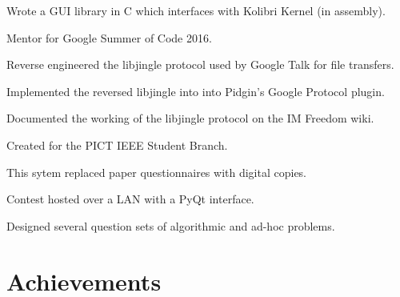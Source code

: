 \documentclass[letterpaper]{deedy-resume} %
\begin{document}
\begin{minipage}[t]{0.66\textwidth}
\begin{tightitemize}
\item Wrote a GUI library in C which interfaces with Kolibri Kernel (in assembly).
\item Mentor for Google Summer of Code 2016.
\end{tightitemize}
\sectionspace %
\begin{tightitemize}
\item Reverse engineered the libjingle protocol used by Google Talk for file transfers.
\item Implemented the reversed libjingle into into Pidgin's Google Protocol plugin.
\item Documented the working of the libjingle protocol on the IM Freedom wiki.
\end{tightitemize}
\sectionspace %
\begin{tightitemize}
\item Created for the PICT IEEE Student Branch.
\item This sytem replaced paper questionnaires with digital copies.
\item Contest hosted over a LAN with a PyQt interface.
\item Designed several question sets of algorithmic and ad-hoc problems.
\end{tightitemize}
\sectionspace %
\section{Achievements}
\sectionspace %
\sectionspace %
\end{minipage} %
\end{document}
